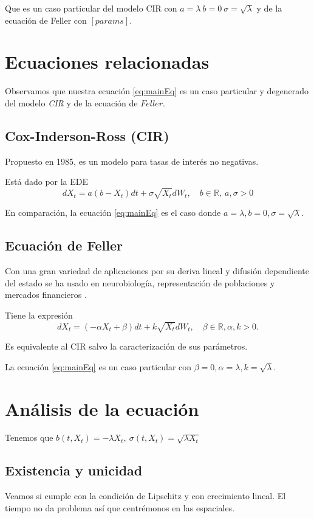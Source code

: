\documentclass[12pt]{article}
\begin{document}
Que es un caso particular del modelo CIR con $a=\lambda\ b= 0\ \sigma=\sqrt{\lambda}$ y de la ecuación de Feller con $[params]$.

\section*{Ecuaciones relacionadas}
Observamos que nuestra ecuación \ref{eq:mainEq} es un caso particular y degenerado del modelo \emph{CIR} y de la ecuación de $Feller$.

\subsection*{Cox-Inderson-Ross (CIR)}
Propuesto en 1985, es un modelo para tasas de interés no negativas. 

Está dado por la EDE
$$dX_t = a(b-X_t)dt + \sigma \sqrt{X_t} dW_t, \quad b\in \mathbb{R},\  a,\sigma>0$$

En comparación, la ecuación \ref{eq:mainEq} es el caso donde $a = \lambda, b = 0, \sigma = \sqrt{\lambda}.$


\subsection*{Ecuación de Feller}
Con una gran variedad de aplicaciones por su deriva lineal y difusión dependiente del estado se ha usado en neurobiología, representación de poblaciones y mercados financieros \cite{MasoliverPerello2012}.

Tiene la expresión
$$dX_t = (-\alpha X_t + \beta) dt + k \sqrt{X_t}dW_t,\quad \beta \in \mathbb{R}, \alpha, k >0.$$


Es equivalente al CIR salvo la caracterización de sus parámetros.

La ecuación \ref{eq:mainEq} es un caso particular con $\beta = 0, \alpha = \lambda, k = \sqrt{\lambda}.$


\section*{Análisis de la ecuación}
Tenemos que $b(t,X_t) = -\lambda X_t, \ \sigma(t,X_t)= \sqrt{\lambda X_t} $

\subsection*{Existencia y unicidad}
Veamos si cumple con la condición de Lipschitz y con crecimiento lineal. El tiempo no da problema así que centrémonos en las espaciales.
\end{document}
